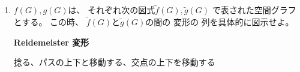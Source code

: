 \documentclass[12pt,b5paper]{ltjsarticle}
\begin{document}
\begin{enumerate}
      \hrulefill


 \item
      $f(G),g(G)$は、
      それぞれ次の図式$\tilde{f}(G),\tilde{g}(G)$
      で表された空間グラフとする。
      この時、
      $\tilde{f}(G)$と$\tilde{g}(G)$の間の
      変形の
      列を具体的に図示せよ。

      \dotfill

      \textbf{Reidemeister 変形}

      捻る、パスの上下と移動する、交点の上下を移動する

      


      \dotfill

      \hrulefill



\end{enumerate}

\hrulefill
\end{document}
